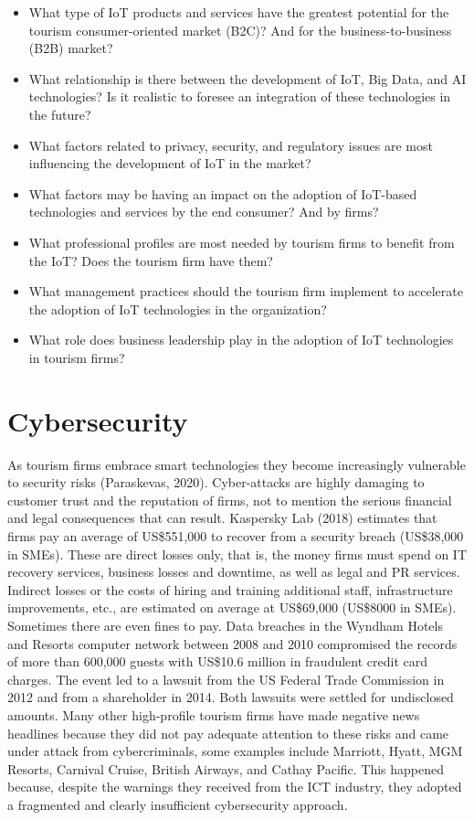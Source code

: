 \documentclass[
  letterpaper,
  DIV=11,
  numbers=noendperiod]{scrreprt}
\begin{document}
\begin{itemize}
\item
  What type of IoT products and services have the greatest potential for
  the tourism consumer-oriented market (B2C)? And for the
  business-to-business (B2B) market?
\item
  What relationship is there between the development of IoT, Big Data,
  and AI technologies? Is it realistic to foresee an integration of
  these technologies in the future?
\item
  What factors related to privacy, security, and regulatory issues are
  most influencing the development of IoT in the market?
\item
  What factors may be having an impact on the adoption of IoT-based
  technologies and services by the end consumer? And by firms?
\item
  What professional profiles are most needed by tourism firms to benefit
  from the IoT? Does the tourism firm have them?
\item
  What management practices should the tourism firm implement to
  accelerate the adoption of IoT technologies in the organization?
\item
  What role does business leadership play in the adoption of IoT
  technologies in tourism firms?
\end{itemize}

\hypertarget{cybersecurity}{%
\chapter{Cybersecurity}\label{cybersecurity}}

As tourism firms embrace smart technologies they become increasingly
vulnerable to security risks (Paraskevas, 2020). Cyber-attacks are
highly damaging to customer trust and the reputation of firms, not to
mention the serious financial and legal consequences that can result.
Kaspersky Lab (2018) estimates that firms pay an average of US\$551,000
to recover from a security breach (US\$38,000 in SMEs). These are direct
losses only, that is, the money firms must spend on IT recovery
services, business losses and downtime, as well as legal and PR
services. Indirect losses or the costs of hiring and training additional
staff, infrastructure improvements, etc., are estimated on average at
US\$69,000 (US\$8000 in SMEs). Sometimes there are even fines to pay.
Data breaches in the Wyndham Hotels and Resorts computer network between
2008 and 2010 compromised the records of more than 600,000 guests with
US\$10.6 million in fraudulent credit card charges. The event led to a
lawsuit from the US Federal Trade Commission in 2012 and from a
shareholder in 2014. Both lawsuits were settled for undisclosed amounts.
Many other high-profile tourism firms have made negative news headlines
because they did not pay adequate attention to these risks and came
under attack from cybercriminals, some examples include Marriott, Hyatt,
MGM Resorts, Carnival Cruise, British Airways, and Cathay Pacific. This
happened because, despite the warnings they received from the ICT
industry, they adopted a fragmented and clearly insufficient
cybersecurity approach.
\end{document}
